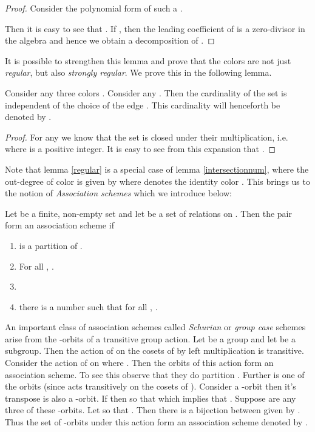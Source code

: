 	 \begin{proof}
		 Consider the polynomial form of such a . 

		 

		 Then it is easy to see that . If , then the leading coefficient of  is a zero-divisor in the algebra  and hence
		 we obtain a decomposition of .
	 \end{proof}

	 It is possible to strengthen this lemma and prove that the colors are not just \emph{regular}, but also \emph{strongly regular}. We prove this in the following lemma.

	 \begin{lemma}\label{intersectionnum}
		 Consider any three colors . Consider any . Then the cardinality of the set  is independent of the choice of the edge .
		 This cardinality will henceforth be denoted by .
	 \end{lemma}
	
	\begin{proof}
		For any  we know that the set  is closed under their multiplication, i.e.  where  is a positive integer. It is easy
		to see from this expansion that .
	\end{proof}

	Note that lemma \ref{regular} is a special case of lemma \ref{intersectionnum}, where the out-degree of color  is given by  where  denotes the identity color . This brings us to the notion of 
	\emph{Association schemes} which we introduce below:

	\begin{definition}\label{scheme} Let  be a finite, non-empty set and let  be a set of relations on . Then the pair  form an association scheme if
		\begin{enumerate}
			\item  is a partition of .
			\item For all , .
			\item 
			\item  there is a number  such that for all , .
		\end{enumerate}
	\end{definition}



	\begin{example}\label{schurian}
			An important class of association schemes called \emph{Schurian} or \emph{group case} schemes arise from the -orbits of a transitive group action. Let  be a group and let  be a subgroup.
			Then the action of  on the cosets of  by left multiplication is transitive. Consider the action of  on  where . Then the orbits of this action form an association scheme. To see this observe that they do partition . Further  is
			one of the orbits (since  acts 
			transitively on the cosets of ). Consider a -orbit  then it's transpose  is also a -orbit. If  then  so that
			 which implies that . Suppose  are any three of these -orbits. Let  so that . Then there is a
			bijection between  given by . Thus the set of -orbits under this action form an association scheme 
			denoted by .
	\end{example}


